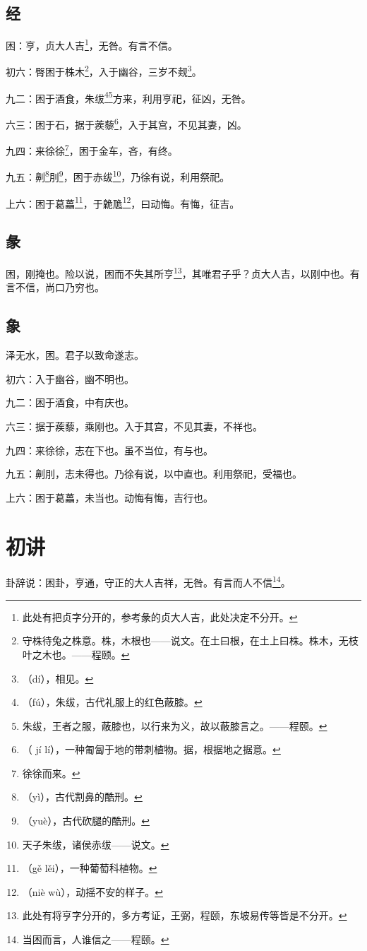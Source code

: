 \documentclass[12pt,oneside]{book}
\begin{document}
\subsection{经}
困：亨，贞大人吉\footnote{此处有把贞字分开的，参考彖的贞大人吉，此处决定不分开。}，无咎。有言不信。

初六：臀困于株木\footnote{守株待兔之株意。株，木根也——说文。在土曰根，在土上曰株。株木，无枝叶之木也。——程颐。}，入于幽谷，三岁不觌\footnote{（dí），相见。}。

九二：困于酒食，朱绂\footnote{（fú），朱绂，古代礼服上的红色蔽膝。}\footnote{朱绂，王者之服，蔽膝也，以行来为义，故以蔽膝言之。——程颐。}方来，利用亨祀，征凶，无咎。

六三：困于石，据于蒺藜\footnote{（ jí lí），一种匍匐于地的带刺植物。据，根据地之据意。}，入于其宫，不见其妻，凶。

九四：来徐徐\footnote{徐徐而来。}，困于金车，吝，有终。

九五：劓\footnote{（yì），古代割鼻的酷刑。}刖\footnote{（yuè），古代砍腿的酷刑。}，困于赤绂\footnote{天子朱绂，诸侯赤绂——说文。}，乃徐有说，利用祭祀。

上六：困于葛藟\footnote{（gě lěi），一种葡萄科植物。}，于臲卼\footnote{（niè wù），动摇不安的样子。}，曰动悔。有悔，征吉。

\subsection{彖}
困，刚掩也。险以说，困而不失其所亨\footnote{此处有将亨字分开的，多方考证，王弼，程颐，东坡易传等皆是不分开。}，其唯君子乎？贞大人吉，以刚中也。有言不信，尚口乃穷也。

\subsection{象}
泽无水，困。君子以致命遂志。

初六：入于幽谷，幽不明也。

九二：困于酒食，中有庆也。

六三：据于蒺藜，乘刚也。入于其宫，不见其妻，不祥也。

九四：来徐徐，志在下也。虽不当位，有与也。

九五：劓刖，志未得也。乃徐有说，以中直也。利用祭祀，受福也。

上六：困于葛藟，未当也。动悔有悔，吉行也。

\section{初讲}
卦辞说：困卦，亨通，守正的大人吉祥，无咎。有言而人不信\footnote{当困而言，人谁信之——程颐。}。
\end{document}
